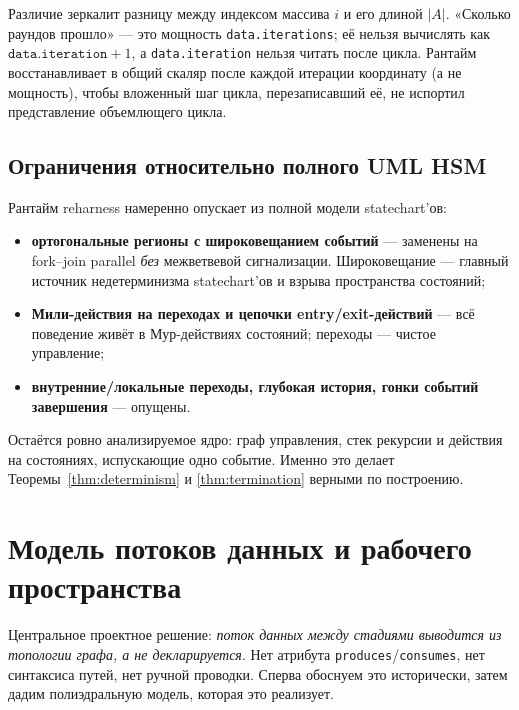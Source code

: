 \documentclass[11pt]{article}
\theoremstyle{plain}
\theoremstyle{definition}
\theoremstyle{remark}
\newcommand{\reharness}{\textsf{reharness}}
\newcommand{\code}[1]{\texttt{#1}}
\newcommand{\state}[1]{\textsf{#1}}
\begin{document}
Различие зеркалит разницу между индексом массива $i$ и его длиной $|A|$. «Сколько раундов
прошло» --- это мощность \code{data.iterations}; её нельзя вычислять как
$\code{data.iteration}+1$, а \code{data.iteration} нельзя читать после цикла. Рантайм
восстанавливает в общий скаляр после каждой итерации координату (а не мощность), чтобы
вложенный шаг цикла, перезаписавший её, не испортил представление объемлющего цикла.

\subsection{Ограничения относительно полного UML HSM}\label{sec:restrictions}

Рантайм \reharness{} намеренно опускает из полной модели statechart'ов:
\begin{itemize}[nosep]
  \item \textbf{ортогональные регионы с широковещанием событий} --- заменены на
        fork--join \state{parallel} \emph{без} межветвевой сигнализации. Широковещание ---
        главный источник недетерминизма statechart'ов и взрыва пространства состояний;
  \item \textbf{Мили-действия на переходах и цепочки entry/exit-действий} --- всё
        поведение живёт в Мур-действиях состояний; переходы --- чистое управление;
  \item \textbf{внутренние/локальные переходы, глубокая история, гонки событий
        завершения} --- опущены.
\end{itemize}
Остаётся ровно анализируемое ядро: граф управления, стек рекурсии и действия на
состояниях, испускающие одно событие. Именно это делает Теоремы~\ref{thm:determinism} и
\ref{thm:termination} верными по построению.

\section{Модель потоков данных и рабочего пространства}\label{sec:dataflow}

Центральное проектное решение: \emph{поток данных между стадиями выводится из топологии
графа, а не декларируется}. Нет атрибута \code{produces}/\code{consumes}, нет синтаксиса
путей, нет ручной проводки. Сперва обоснуем это исторически, затем дадим полиэдральную
модель, которая это реализует.
\end{document}
